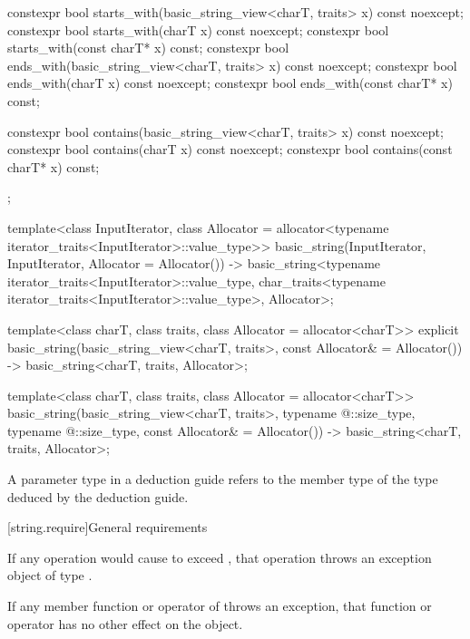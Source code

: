 \begin{codeblock}
{{    constexpr bool starts_with(basic_string_view<charT, traits> x) const noexcept;
    constexpr bool starts_with(charT x) const noexcept;
    constexpr bool starts_with(const charT* x) const;
    constexpr bool ends_with(basic_string_view<charT, traits> x) const noexcept;
    constexpr bool ends_with(charT x) const noexcept;
    constexpr bool ends_with(const charT* x) const;

    constexpr bool contains(basic_string_view<charT, traits> x) const noexcept;
    constexpr bool contains(charT x) const noexcept;
    constexpr bool contains(const charT* x) const;
  };

  template<class InputIterator,
           class Allocator = allocator<typename iterator_traits<InputIterator>::value_type>>
    basic_string(InputIterator, InputIterator, Allocator = Allocator())
      -> basic_string<typename iterator_traits<InputIterator>::value_type,
                      char_traits<typename iterator_traits<InputIterator>::value_type>,
                      Allocator>;

  template<class charT,
           class traits,
           class Allocator = allocator<charT>>
    explicit basic_string(basic_string_view<charT, traits>, const Allocator& = Allocator())
      -> basic_string<charT, traits, Allocator>;

  template<class charT,
           class traits,
           class Allocator = allocator<charT>>
    basic_string(basic_string_view<charT, traits>,
                 typename @\seebelow@::size_type, typename @\seebelow@::size_type,
                 const Allocator& = Allocator())
      -> basic_string<charT, traits, Allocator>;
}
\end{codeblock}

\pnum
A  parameter type in
a  deduction guide
refers to the  member type of
the type deduced by the deduction guide.

[string.require]{General requirements}

\pnum
If any operation would cause  to
exceed , that operation throws an
exception object of type .

\pnum
If any member function or operator of  throws an exception, that
function or operator has no other effect on the  object.

